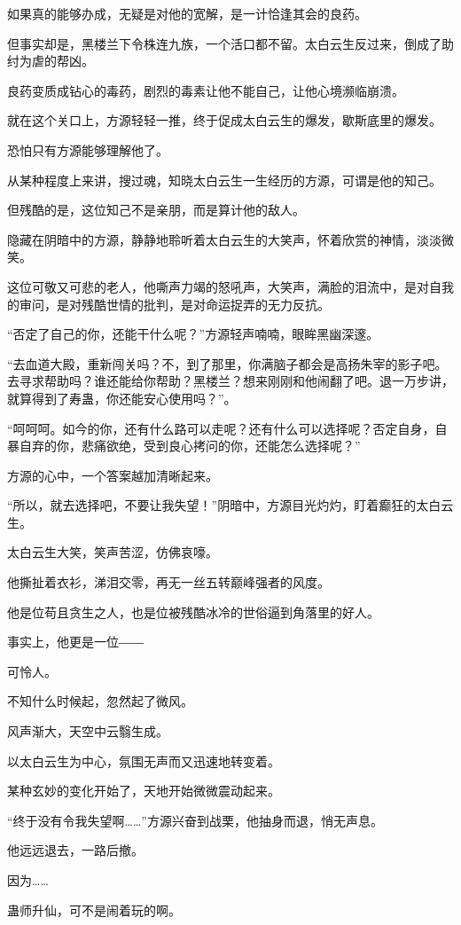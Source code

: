 \begin{this_body}
如果真的能够办成，无疑是对他的宽解，是一计恰逢其会的良药。

但事实却是，黑楼兰下令株连九族，一个活口都不留。太白云生反过来，倒成了助纣为虐的帮凶。

良药变质成钻心的毒药，剧烈的毒素让他不能自己，让他心境濒临崩溃。

就在这个关口上，方源轻轻一推，终于促成太白云生的爆发，歇斯底里的爆发。

恐怕只有方源能够理解他了。

从某种程度上来讲，搜过魂，知晓太白云生一生经历的方源，可谓是他的知己。

但残酷的是，这位知己不是亲朋，而是算计他的敌人。

隐藏在阴暗中的方源，静静地聆听着太白云生的大笑声，怀着欣赏的神情，淡淡微笑。

这位可敬又可悲的老人，他嘶声力竭的怒吼声，大笑声，满脸的泪流中，是对自我的审问，是对残酷世情的批判，是对命运捉弄的无力反抗。

“否定了自己的你，还能干什么呢？”方源轻声喃喃，眼眸黑幽深邃。

“去血道大殿，重新闯关吗？不，到了那里，你满脑子都会是高扬朱宰的影子吧。去寻求帮助吗？谁还能给你帮助？黑楼兰？想来刚刚和他闹翻了吧。退一万步讲，就算得到了寿蛊，你还能安心使用吗？”。

“呵呵呵。如今的你，还有什么路可以走呢？还有什么可以选择呢？否定自身，自暴自弃的你，悲痛欲绝，受到良心拷问的你，还能怎么选择呢？”

方源的心中，一个答案越加清晰起来。

“所以，就去选择吧，不要让我失望！”阴暗中，方源目光灼灼，盯着癫狂的太白云生。

太白云生大笑，笑声苦涩，仿佛哀嚎。

他撕扯着衣衫，涕泪交零，再无一丝五转巅峰强者的风度。

他是位苟且贪生之人，也是位被残酷冰冷的世俗逼到角落里的好人。

事实上，他更是一位――

可怜人。

不知什么时候起，忽然起了微风。

风声渐大，天空中云翳生成。

以太白云生为中心，氛围无声而又迅速地转变着。

某种玄妙的变化开始了，天地开始微微震动起来。

“终于没有令我失望啊……”方源兴奋到战栗，他抽身而退，悄无声息。

他远远退去，一路后撤。

因为……

蛊师升仙，可不是闹着玩的啊。


\end{this_body}

